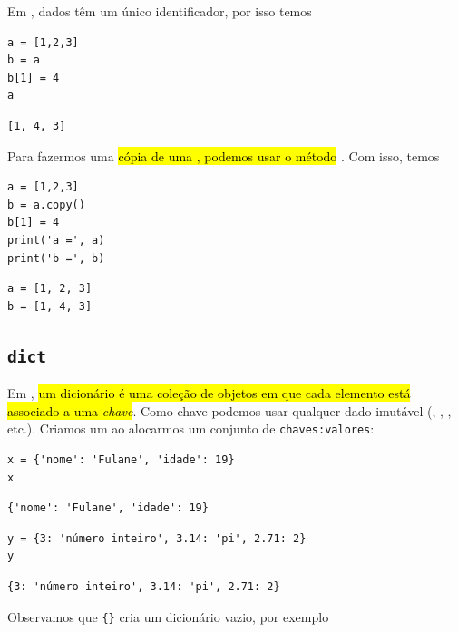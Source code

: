 \begin{obs}
  Em {\python}, dados têm um único identificador, por isso temos

\begin{lstlisting}
a = [1,2,3]
b = a
b[1] = 4
a
\end{lstlisting}

\begin{verbatim}
[1, 4, 3]
\end{verbatim}

Para fazermos uma \hl{cópia de uma {\PYTHONlist}, podemos usar o método {\PYTHONlistDOTcopy}}. Com isso, temos

\begin{lstlisting}
a = [1,2,3]
b = a.copy()
b[1] = 4
print('a =', a)
print('b =', b)
\end{lstlisting}

\begin{verbatim}
a = [1, 2, 3]
b = [1, 4, 3]  
\end{verbatim}

\end{obs}

\subsection{\texttt{dict}}

Em {\python}, \hl{um dicionário {\PYTHONdict} é uma coleção de objetos em que cada elemento está associado a uma \emph{chave}}. Como chave podemos usar qualquer dado imutável ({\PYTHONint}, {\PYTHONfloat}, {\PYTHONstr}, etc.). Criamos um {\PYTHONdict} ao alocarmos um conjunto de \texttt{chaves:valores}:

\begin{lstlisting}
x = {'nome': 'Fulane', 'idade': 19}
x
\end{lstlisting}

\begin{verbatim}
{'nome': 'Fulane', 'idade': 19}
\end{verbatim}

\begin{lstlisting}
y = {3: 'número inteiro', 3.14: 'pi', 2.71: 2}
y
\end{lstlisting}

\begin{verbatim}
{3: 'número inteiro', 3.14: 'pi', 2.71: 2}
\end{verbatim}

Observamos que \lstinline+{}+ cria um dicionário vazio, por exemplo

